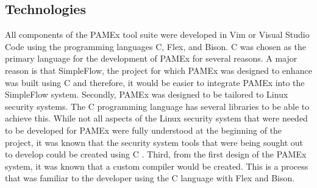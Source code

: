 \subsection{Technologies}
\par 
\vspace{\baselineskip}
\hspace{1em}
All components of the PAMEx tool suite were developed in Vim or Visual 
Studio Code using the programming languages C, Flex, and Bison. 
C was chosen as the primary language for the 
development of PAMEx for several reasons. A major reason is that 
SimpleFlow, the project for which PAMEx was designed to enhance was 
built using C \cite{ryan2016} and therefore, it would be easier to integrate PAMEx into the 
SimpleFlow system. Secondly, PAMEx was designed to be tailored to Linux 
security systems. The C programming language has several libraries to 
be able to achieve this. While not all 
aspects of the Linux security system that were needed to be developed for PAMEx were fully understood at 
the beginning of the project, it was known that the security system 
tools that were being sought out to develop could be created using C \cite{linuxpam}\cite{man7pam}\cite{man7xattr}\cite{selinux}. 
Third, from the first design of the PAMEx system, it was known that a custom compiler would be created. 
This is a process that was familiar to the developer using the C language with Flex and Bison. 
\vspace{\baselineskip}

